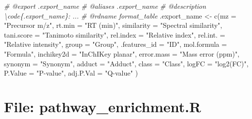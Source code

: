 \documentclass[
]{article}
\newenvironment{Shaded}{\begin{snugshade}}{\end{snugshade}}
\newcommand{\AttributeTok}[1]{\textcolor[rgb]{0.77,0.63,0.00}{#1}}
\newcommand{\CommentTok}[1]{\textcolor[rgb]{0.56,0.35,0.01}{\textit{#1}}}
\newcommand{\FunctionTok}[1]{\textcolor[rgb]{0.00,0.00,0.00}{#1}}
\newcommand{\NormalTok}[1]{#1}
\newcommand{\OtherTok}[1]{\textcolor[rgb]{0.56,0.35,0.01}{#1}}
\newcommand{\StringTok}[1]{\textcolor[rgb]{0.31,0.60,0.02}{#1}}
\begin{document}
\begin{Shaded}
\begin{Highlighting}[]
\CommentTok{\#\textquotesingle{} @export .export\_name}
\CommentTok{\#\textquotesingle{} @aliases .export\_name}
\CommentTok{\#\textquotesingle{} @description \textbackslash{}code\{.export\_name\}: ...}
\CommentTok{\#\textquotesingle{} @rdname format\_table}
\NormalTok{.export\_name }\OtherTok{\textless{}{-}} \FunctionTok{c}\NormalTok{(}\AttributeTok{mz =} \StringTok{"Precursor m/z"}\NormalTok{,}
  \AttributeTok{rt.min =} \StringTok{"RT (min)"}\NormalTok{,}
  \AttributeTok{similarity =} \StringTok{"Spectral similarity"}\NormalTok{,}
  \AttributeTok{tani.score =} \StringTok{"Tanimoto similarity"}\NormalTok{,}
  \AttributeTok{rel.index =} \StringTok{"Relative index"}\NormalTok{,}
  \AttributeTok{rel.int. =} \StringTok{"Relative intensity"}\NormalTok{,}
  \AttributeTok{group =} \StringTok{"Group"}\NormalTok{,}
  \AttributeTok{.features\_id =} \StringTok{"ID"}\NormalTok{,}
  \AttributeTok{mol.formula =} \StringTok{"Formula"}\NormalTok{,}
  \AttributeTok{inchikey2d =} \StringTok{"InChIKey planar"}\NormalTok{,}
  \AttributeTok{error.mass =} \StringTok{"Mass error (ppm)"}\NormalTok{,}
  \AttributeTok{synonym =} \StringTok{"Synonym"}\NormalTok{,}
  \AttributeTok{adduct =} \StringTok{"Adduct"}\NormalTok{,}
  \AttributeTok{class =} \StringTok{"Class"}\NormalTok{,}
  \AttributeTok{logFC =} \StringTok{"log2(FC)"}\NormalTok{,}
  \AttributeTok{P.Value =} \StringTok{"P{-}value"}\NormalTok{,}
  \AttributeTok{adj.P.Val =} \StringTok{"Q{-}value"}
\NormalTok{)}
\end{Highlighting}
\end{Shaded}

\hypertarget{file-pathway_enrichment.r}{%
\section{File: pathway\_enrichment.R}\label{file-pathway_enrichment.r}}
\end{document}
